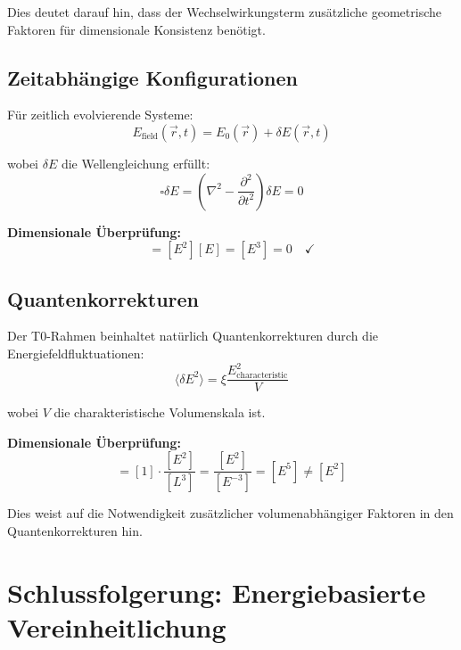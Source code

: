 \documentclass[12pt,a4paper]{report}
\begin{document}
	Dies deutet darauf hin, dass der Wechselwirkungsterm zusätzliche geometrische Faktoren für dimensionale Konsistenz benötigt.
	
	\subsection{Zeitabhängige Konfigurationen}
	\label{subsec:time_dependent}
	
	Für zeitlich evolvierende Systeme:
	\begin{equation}
		E_{\text{field}}(\vec{r}, t) = E_0(\vec{r}) + \delta E(\vec{r}, t)
	\end{equation}
	
	wobei $\delta E$ die Wellengleichung erfüllt:
	\begin{equation}
		\square \delta E = \left(\nabla^2 - \frac{\partial^2}{\partial t^2}\right) \delta E = 0
	\end{equation}
	
	\textbf{Dimensionale Überprüfung:}
	\begin{equation}
		[\square \delta E] = [E^2][E] = [E^3] = 0 \quad \checkmark
	\end{equation}
	
	\subsection{Quantenkorrekturen}
	\label{subsec:quantum_corrections}
	
	Der T0-Rahmen beinhaltet natürlich Quantenkorrekturen durch die Energiefeldfluktuationen:
	\begin{equation}
		\langle \delta E^2 \rangle = \xi \frac{E_{\text{characteristic}}^2}{V}
	\end{equation}
	
	wobei $V$ die charakteristische Volumenskala ist.
	
	\textbf{Dimensionale Überprüfung:}
	\begin{equation}
		[\langle \delta E^2 \rangle] = [1] \cdot \frac{[E^2]}{[L^3]} = \frac{[E^2]}{[E^{-3}]} = [E^5] \neq [E^2]
	\end{equation}
	
	Dies weist auf die Notwendigkeit zusätzlicher volumenabhängiger Faktoren in den Quantenkorrekturen hin.
	
	\section{Schlussfolgerung: Energiebasierte Vereinheitlichung}
	\label{sec:conclusion_energy_unification}
	
\end{document}
